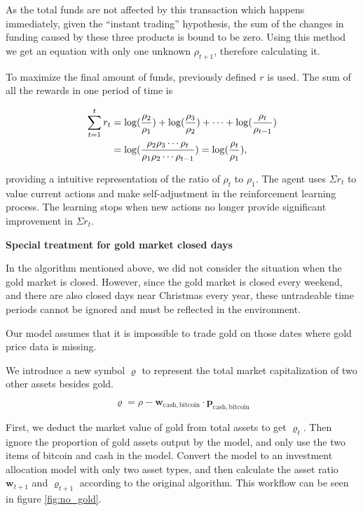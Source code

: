 \documentclass{mcmthesis}
\begin{document}
As the total funds are not affected by this transaction which happens immediately,
given the ``instant trading'' hypothesis,
the sum of the changes in funding caused by these three products is bound to be zero.
Using this method we get an equation with only one unknown $\rho _{t+1}$,
therefore calculating it.

To maximize the final amount of funds,
previously defined $r$ is used.
The sum of all the rewards in one period of time is


\begin{align}
  \sum_{t=1}^t r_t &= \log(\frac{\rho_2}{\rho_1}) + \log(\frac{\rho_3}{\rho_2}) + \cdots + \log(\frac{\rho_t}{\rho_{t-1}}) \notag \\
  &= \log(\frac{\rho_2 \rho_3 \cdots \rho_t}{\rho_1 \rho_2 \cdots \rho_{t-1}}) = \log(\frac{\rho_t}{\rho_1}),
\end{align}

providing a intuitive representation of the ratio of $\rho_t$ to $\rho_1$.
The agent uses $\Sigma r_t$ to value current actions and make self-adjustment
in the reinforcement learning process.
The learning stops when new actions no longer provide significant improvement in $\Sigma r_t$.

\noindent \textbf{Special treatment for gold market closed days} \par
In the algorithm mentioned above, we did not consider the situation when the gold market is closed. However, since the gold market is closed every weekend, and there are also closed days near Christmas every year, these untradeable time periods cannot be ignored and must be reflected in the environment.

Our model assumes that it is impossible to trade gold on those dates where gold price data is missing.

We introduce a new symbol $\varrho$ to represent the total market capitalization of two other assets besides gold.

\[
  \varrho = \rho - \pmb{w}_{\mathrm{cash, bitcoin}} \cdot \pmb{p}_{\mathrm{cash, bitcoin}}
\]


First, we deduct the market value of gold from total assets to get $\varrho_{t}$. Then ignore the proportion of gold assets output by the model, and only use the two items of bitcoin and cash in the model. Convert the model to an investment allocation model with only two asset types, and then calculate the asset ratio $\pmb{w}_{t+1}$ and $\varrho_{t+1}$ according to the original algorithm. This workflow can be seen in figure \ref{fig:no_gold}.
\end{document}
